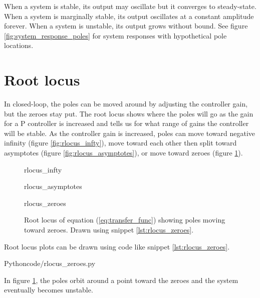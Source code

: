 When a system is stable, its output may oscillate but it converges to
steady-state. When a system is marginally stable, its output oscillates at a
constant amplitude forever. When a system is unstable, its output grows without
bound. See figure \ref{fig:system_response_poles} for system responses with
hypothetical pole locations.

\section{Root locus}

In closed-loop, the poles can be moved around by adjusting the controller gain,
but the zeroes stay put. The root locus shows where the poles will go as the
gain for a P controller is increased and tells us for what range of gains the
controller will be stable. As the controller gain is increased, poles can move
toward negative infinity (figure \ref{fig:rlocus_infty}), move toward each other
then split toward asymptotes (figure \ref{fig:rlocus_asymptotes}), or move
toward zeroes (figure \ref{fig:rlocus_zeroes}).

\begin{figure}
  \begin{minisvg}{rlocus_infty}
    \caption{Root locus showing pole moving toward negative infinity.}
    \label{fig:rlocus_infty}
  \end{minisvg}
  \hfill
  \begin{minisvg}{rlocus_asymptotes}
    \caption{Root locus showing poles moving toward asymptotes.}
    \label{fig:rlocus_asymptotes}
  \end{minisvg}
  \begin{minisvg}{rlocus_zeroes}
    \caption{Root locus of equation (\ref{eq:transfer_func}) showing poles
      moving toward zeroes. Drawn using snippet \ref{lst:rlocus_zeroes}.}
    \label{fig:rlocus_zeroes}
  \end{minisvg}
\end{figure}

Root locus plots can be drawn using code like snippet \ref{lst:rlocus_zeroes}.

\begin{code}{Python}{code/rlocus_zeroes.py}
  \caption{Root locus in Python.}
  \label{lst:rlocus_zeroes}
\end{code}

In figure \ref{fig:rlocus_zeroes}, the poles orbit around a point toward the
zeroes and the \gls{system} eventually becomes unstable.

